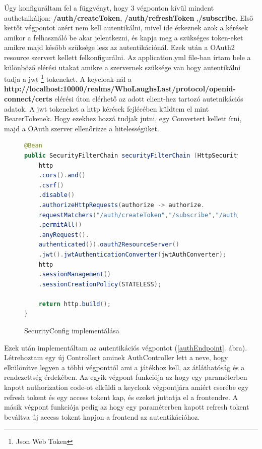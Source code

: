 \documentclass[a4paper,twoside]{article}
\begin{document}
Úgy konfiguráltam fel a függvényt, hogy 3 végponton kívül mindent authetnikáljon: \textbf{/auth/createToken}, \textbf{/auth/refreshToken} ,\textbf{/subscribe}. Első kettőt végpontot azért nem kell autentikálni, mivel ide érkeznek azok a kérések amikor a felhasználó be akar jelentkezni, és kapja meg a szükséges token-eket amikre majd később szüksége lesz az autentikációnál. Ezek után a OAuth2 resource szervert kellett felkonfigurálni. Az application.yml file-ban írtam bele a különböző elérési utakat amikre a szervernek szüksége van hogy autentikálni tudja a jwt \footnote{Json Web Token} tokeneket. A keycloak-nál a \textbf{http://localhost:10000/realms/WhoLaughsLast/protocol/openid-connect/certs} elérési úton 
elérhető az adott client-hez tartozó autetnikációs adatok. A jwt tokeneket a http kérések fejlécében küldtem el mint BearerTokenek. Hogy ezekhez hozzá tudjak jutni,
egy Convertert kellett írni, majd a OAuth szerver ellenőrizze a hitelességüket. 

\begin{figure}
	\caption{SecurityConfig implementálása}
	\centering
\begin{lstlisting}[language=java]
@Bean
public SecurityFilterChain securityFilterChain (HttpSecurity http) throws Exception{
	http
	.cors().and()
	.csrf()
	.disable()
	.authorizeHttpRequests(authorize -> authorize.
	requestMatchers("/auth/createToken","/subscribe","/auth/refreshToken")
	.permitAll()
	.anyRequest().
	authenticated()).oauth2ResourceServer()
	.jwt().jwtAuthenticationConverter(jwtAuthConverter);
	http
	.sessionManagement()
	.sessionCreationPolicy(STATELESS);
	
	return http.build();
}
\end{lstlisting}
\label{secConf}
\end{figure}
\FloatBarrier


Ezek után implementáltam az autentikációs végpontot (\ref{authEndpoint}. ábra). Létrehoztam egy új Controllert aminek AuthController lett a neve,
hogy elkülönítve legyen a többi végponttól ami a játékhoz kell, az átláthatóság és a rendezettség érdekében. Az egyik végpont 
funkciója az hogy egy paraméterben kapott authorization code-ot elküldi a keycloak végpontjára amiért cserébe egy refresh tokent és egy access tokent kap,
és ezeket juttatja el a frontendre. A másik végpont funkciója pedig az hogy egy paraméterben kapott refresh tokent beváltva új access tokent kapjon a frontend az autentikációhoz. 
\end{document}
